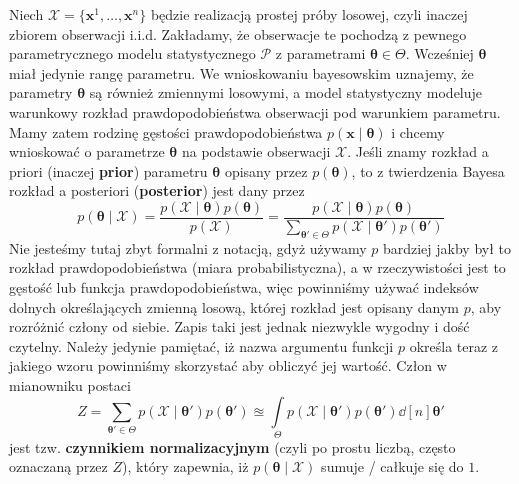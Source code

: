 \documentclass{myclass}
\numberwithin{equation}{subsection}
\begin{document}
Niech \(\mathcal{X} = \{\mathbf{x}^1,\ldots,\mathbf{x}^n\}\) będzie realizacją prostej próby
losowej, czyli inaczej zbiorem obserwacji i.i.d. Zakładamy, że obserwacje te pochodzą z pewnego
parametrycznego modelu statystycznego \(\mathcal{P}\) z parametrami \(\boldsymbol{\theta} \in
\Theta\). Wcześniej \(\boldsymbol{\theta}\) miał jedynie rangę parametru. We wnioskowaniu
bayesowskim uznajemy, że parametry \(\boldsymbol{\theta}\) są również zmiennymi losowymi, a model
statystyczny modeluje warunkowy rozkład prawdopodobieństwa obserwacji pod warunkiem parametru. Mamy
zatem rodzinę gęstości prawdopodobieństwa \(p(\mathbf{x} \mid \boldsymbol{\theta})\) i chcemy
wnioskować o parametrze \(\boldsymbol{\theta}\) na podstawie obserwacji \(\mathcal{X}\). Jeśli znamy
rozkład a priori (inaczej \textbf{prior}) parametru \(\boldsymbol{\theta}\) opisany przez
\(p(\boldsymbol{\theta})\), to z twierdzenia Bayesa rozkład a posteriori (\textbf{posterior}) jest
dany przez
\begin{equation}
    p(\boldsymbol{\theta} \mid \mathcal{X}) = \frac{p(\mathcal{X} \mid \boldsymbol{\theta}) p(\boldsymbol{\theta})}{p(\mathcal{X})} = \frac{p(\mathcal{X} \mid \boldsymbol{\theta}) p(\boldsymbol{\theta})}{\sum_{\boldsymbol{\theta}' \in \Theta} p(\mathcal{X} \mid \boldsymbol{\theta}') p(\boldsymbol{\theta}')}
\end{equation}
Nie jesteśmy tutaj zbyt formalni z notacją, gdyż używamy \(p\) bardziej jakby był to rozkład
prawdopodobieństwa (miara probabilistyczna), a w rzeczywistości jest to gęstość lub funkcja
prawdopodobieństwa, więc powinniśmy używać indeksów dolnych określających zmienną losową, której
rozkład jest opisany danym \(p\), aby rozróżnić człony od siebie. Zapis taki jest jednak niezwykle
wygodny i dość czytelny. Należy jedynie pamiętać, iż nazwa argumentu funkcji \(p\) określa teraz z
jakiego wzoru powinniśmy skorzystać aby obliczyć jej wartość. Człon w mianowniku postaci
\begin{equation}
     Z = \sum_{\boldsymbol{\theta}' \in \Theta} p(\mathcal{X} \mid \boldsymbol{\theta}') p (\boldsymbol{\theta}') \approxeq \int\limits_\Theta p(\mathcal{X} \mid \boldsymbol{\theta}') p (\boldsymbol{\theta}') \dd[n]{\boldsymbol{\theta}'}
\end{equation}
jest tzw. \textbf{czynnikiem normalizacyjnym} (czyli po prostu liczbą, często oznaczaną przez
\(Z\)), który zapewnia, iż \(p(\boldsymbol{\theta} \mid \mathcal{X})\) sumuje / całkuje się do
\(1\).
\end{document}
